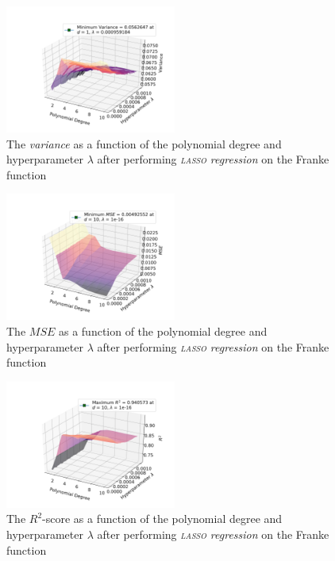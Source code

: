 \documentclass[a4paper,10pt,english]{article}
\begin{document}
\begin{multicols*}{2}

\begin{figure}[H]
	\centering 
	\includegraphics[width = 0.5\textwidth, center]{../franke_output/part_E_1.png}
	\caption{The \textit{variance} as a function of the polynomial degree and hyperparameter $\lambda$ after performing \textit{\textsc{lasso} regression} on the Franke function}
	\label{fig_12}
\end{figure}

\begin{figure}[H]
	\centering 
	\includegraphics[width = 0.5\textwidth, center]{../franke_output/part_E_2.png}
	\caption{The $MSE$ as a function of the polynomial degree and hyperparameter $\lambda$ after performing \textit{\textsc{lasso} regression} on the Franke function}
	\label{fig_13}
\end{figure}

\begin{figure}[H]
	\centering 
	\includegraphics[width = 0.5\textwidth, center]{../franke_output/part_E_3.png}
	\caption{The $R^2$-score as a function of the polynomial degree and hyperparameter $\lambda$ after performing \textit{\textsc{lasso} regression} on the Franke function}
	\label{fig_14}
\end{figure}


\end{multicols*}
\end{document}
